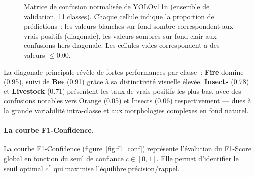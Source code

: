 \begin{figure}[H]
{%
}
\caption[Matrice de confusion YOLOv11n]{Matrice de confusion normalisée de YOLOv11n (ensemble de validation, 11 classes).
Chaque cellule indique la proportion de prédictions~: les valeurs blanches sur fond sombre
correspondent aux vrais positifs (diagonale), les valeurs sombres sur fond clair aux
confusions hors-diagonale. Les cellules vides correspondent à des valeurs $\leq 0.00$.}
\label{fig:confusion_norm}
\end{figure}

\noindent
La diagonale principale révèle de fortes performances par classe~: \textbf{Fire}
domine (0.95), suivi de \textbf{Bee} (0.91) grâce à sa distinctivité visuelle
élevée. \textbf{Insects} (0.78) et \textbf{Livestock} (0.71) présentent les taux
de vrais positifs les plus bas, avec des confusions notables vers Orange (0.05)
et Insects (0.06) respectivement — dues à la grande variabilité intra-classe et
aux morphologies complexes en fond naturel.

\paragraph{La courbe F1-Confidence.}
La courbe F1-Confidence (figure~\ref{fig:f1_conf}) représente l'évolution du
F1-Score global en fonction du seuil de confiance $c \in [0,1]$. Elle permet
d'identifier le seuil optimal $c^*$ qui maximise l'équilibre précision/rappel.

